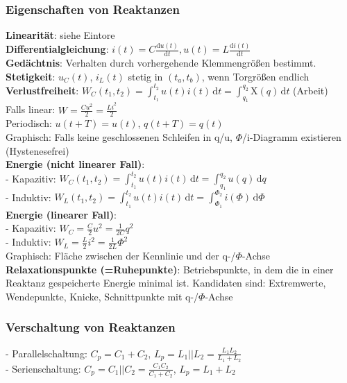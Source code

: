 \documentclass[fs, footer]{latex4ei}
\begin{document}
\begin{multicols*}{4}
    \subsubsection{Eigenschaften von Reaktanzen}
    \textbf{Linearität}: siehe Eintore\\
    \textbf{Differentialgleichung}: $i(t) = C \frac{\mathrm du(t)}{\mathrm dt}, u(t) = L \frac{\mathrm di(t)}{\mathrm dt}$\\
    \textbf{Gedächtnis}: Verhalten durch vorhergehende Klemmengrößen bestimmt.\\
    \textbf{Stetigkeit}: $u_C(t)$, $i_L(t)$ stetig in $(t_a, t_b)$, wenn Torgrößen endlich\\
    \textbf{Verlustfreiheit}: $W_C(t_1, t_2) = \int_{t_1}^{t_2}\! u(t)i(t)\,\mathrm dt = \int_{q_1}^{q_2}\! \mathrm{X}(q)\,\mathrm{d}t$ (Arbeit)\\
    Falls linear: $W = \frac{Cu^2}{2} = \frac{Li^2}{2}$\\
    Periodisch: $u(t+T) = u(t)$, $q(t+T) = q(t)$\\
    Graphisch: Falls keine geschlossenen Schleifen in q/u, $\Phi$/i-Diagramm existieren (Hystenesefrei)\\
    \textbf{Energie (nicht linearer Fall)}:\\
    - Kapazitiv: $W_C(t_1, t_2) = \int_{t_1}^{t_2} \! u(t)i(t)\, \mathrm dt = \int_{q_1}^{q_2} \! u(q)\, \mathrm dq$\\
    - Induktiv: $W_L(t_1, t_2) = \int_{t_1}^{t_2} \! u(t)i(t)\, \mathrm dt = \int_{\Phi_1}^{\Phi_2} \! i(\Phi)\, \mathrm d\Phi$\\
    \textbf{Energie (linearer Fall)}:\\
    - Kapazitiv: $W_C = \frac{C}{2}u^2 = \frac{1}{2C}q^2$\\
    - Induktiv: $W_L = \frac{L}{2}i^2 = \frac{1}{2L} \Phi^2$\\
    Graphisch: Fläche zwischen der Kennlinie und der q-/$\Phi$-Achse\\
    \textbf{Relaxationspunkte (=Ruhepunkte)}: Betriebspunkte, in dem die in einer Reaktanz gespeicherte Energie minimal ist. Kandidaten sind: Extremwerte, Wendepunkte, Knicke, Schnittpunkte mit q-/$\Phi$-Achse\\
    \subsubsection{Verschaltung von Reaktanzen}
    - Parallelschaltung: $C_p = C_1 + C_2$, $L_p = L_1 || L_2 = \frac{L_1L_2}{L_1+L_2}$\\
    - Serienschaltung: $C_p = C_1 || C_2 = \frac{C_1C_2}{C_1+C_2}$, $L_p = L_1 + L_2$\\



\end{multicols*}
\end{document}
